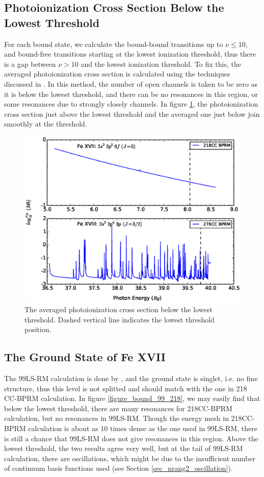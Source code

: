 \subsection{Photoionization Cross Section Below the Lowest Threshold}
For each bound state, we calculate the bound-bound transitions up to $\nu \leq 10$, and bound-free transitions starting at the lowest ionization threshold, thus there is a gap between $\nu > 10$ and the lowest ionization threshold. To fix this, the averaged photoionization cross section is calculated using the techniques discussed in \citet{opcd_4}. In this method, the number of open channels is taken to be zero as it is below the lowest threshold, and there can be no resonances in this region, or some resonances due to strongly closely channels. In figure \ref{figure_negative_region}, the photoionization cross section just above the lowest threshold and the averaged one just below join smoothly at the threshold.

\begin{figure}
	\centering
	\includegraphics[width=.9\textwidth]{figures_chap_4/negative_region}	
	\caption{The averaged photoionization cross section below the lowest threshold. Dashed vertical line indicates the lowest threshold position.}
	\label{figure_negative_region}
\end{figure}

\subsection{The Ground State of Fe XVII}
The 99LS-RM calculation is done by \citet{99cc_2016}, and the ground state is singlet, i.e. no fine structure, thus this level is not splitted and should match with the one in 218 CC-BPRM calculation. In figure \ref{figure_bound_99_218}, we may easily find that below the lowest threshold, there are many resonances for 218CC-BPRM calculation, but no resonances in 99LS-RM. Though the energy mesh in 218CC-BPRM calculation is about as 10 times dense as the one used in 99LS-RM, there is still a chance that 99LS-RM does not give resonances in this region. Above the lowest threshold, the two results agree very well, but at the tail of 99LS-RM calculation, there are oscillations, which might be due to the insufficient number of continuum basis functions used (see Section \ref{sec_nrang2_oscillation}). 

